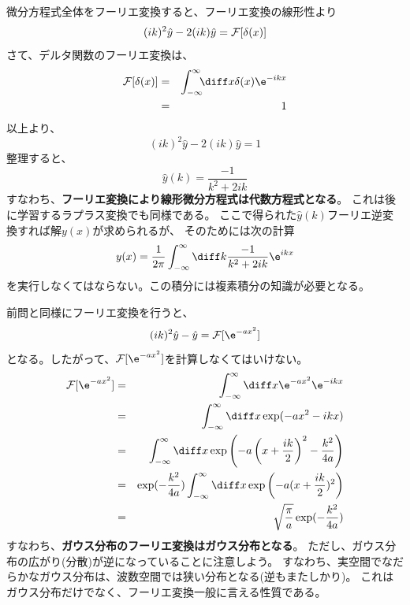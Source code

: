 微分方程式全体をフーリエ変換すると、フーリエ変換の線形性より
\begin{equation}
  (ik)^2 \hat{y} - 2 (ik) \hat{y} = {\cal F}[\delta(x)]
\end{equation}
さて、デルタ関数のフーリエ変換は、
\begin{eqnarray}
  {\cal F}[\delta(x)] &=& \int_{-\infty}^{\infty} \!\!\! \diff x \delta(x) \e^{-ikx}\\
  &=& 1
\end{eqnarray}
以上より、
\begin{equation}
  (ik)^2 \hat{y} - 2 (ik) \hat{y} = 1
\end{equation}
整理すると、
\begin{equation}
  \hat{y}(k) = \frac{-1}{k^2+2ik}
\end{equation}
すなわち、{\bf フーリエ変換により線形微分方程式は代数方程式となる}。
これは後に学習するラプラス変換でも同様である。
ここで得られた$\hat{y}(k)$フーリエ逆変換すれば解$y(x)$が求められるが、
そのためには次の計算
\begin{equation}
  y(x) = \frac{1}{2 \pi} \int_{-\infty}^{\infty}\diff k \frac{-1}{k^2+2ik} \e^{ikx}
\end{equation}
を実行しなくてはならない。この積分には複素積分の知識が必要となる。

前問と同様にフーリエ変換を行うと、
\begin{equation}
  (ik)^2 \hat{y} - \hat{y} = {\cal F}[\e^{-ax^2}]
\end{equation}
となる。したがって、${\cal F}[\e^{-ax^2}]$を計算しなくてはいけない。
\begin{eqnarray}
  {\cal F}[\e^{-ax^2}] &=& \int_{-\infty}^{\infty}\diff x \e^{-ax^2} \e^{-ikx}\\
  &=& \int_{-\infty}^{\infty}\diff x \exp({-ax^2-ikx})\\
  &=& \int_{-\infty}^{\infty}\diff x \exp\left( -a \left(x+\frac{ik}{2}\right)^2 - \frac{k^2}{4a} \right)\\
  &=& \exp(-{\frac{k^2}{4a}})  \int_{-\infty}^{\infty}\diff x \exp\left( -a (x+\frac{ik}{2})^2 \right)\\
  &=& \sqrt{\frac{\pi}{a}} \exp(-{\frac{k^2}{4a}})
\end{eqnarray}
すなわち、{\bf ガウス分布のフーリエ変換はガウス分布となる}。
ただし、ガウス分布の広がり(分散)が逆になっていることに注意しよう。
すなわち、実空間でなだらかなガウス分布は、波数空間では狭い分布となる(逆もまたしかり)。
これはガウス分布だけでなく、フーリエ変換一般に言える性質である。

